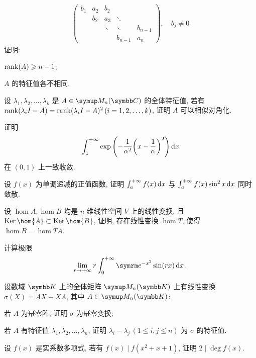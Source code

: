 \begin{exercise}[resume=exer]
\begin{align*}
\begin{pmatrix}
              b_{1} & a_{2} & b_{2} & & \\
              & b_{2} & a_{3} & \ddots & \\
              & & \ddots & \ddots & b_{n-1} \\
              & & & b_{n-1} & a_{n}
          \end{pmatrix},\quad b_{j} \ne 0
      \end{align*}
      证明:
      \begin{exercise}
          \item $ \rank(A) \geqslant n-1 $;
          \item $ A $ 的特征值各不相同.
      \end{exercise}
      \item 设 $ \lambda_{1}, \lambda_{2}, \dots, \lambda_{k} $ 是 $ A\in \MM[\C] $ 的全体特征值, 若有 $ \rank(\lambda_{i}I - A) = \rank(\lambda_{i}I - A)^{2}\,(i = 1, 2, \dots, k) $, 证明 $ A $ 可以相似对角化.
      \item 证明
      \begin{align*}
          \int_{1}^{+\infty}\exp\qty(-\frac{1}{\alpha^{2}}\qty(x-\frac{1}{\alpha})^{2}) \dx*
      \end{align*}
      在 $ (0, 1) $ 上一致收敛.
      \item 设 $ f(x) $ 为单调递减的正值函数, 证明 $ \int_{a}^{+\infty} f(x) \dx* $ 与 $ \int_{a}^{+\infty} f(x)\sin^{2}{x} \dx* $ 同时敛散.
      \item 设 $ \hom{A}, \hom{B} $ 均是 $ n $ 维线性空间 $ V $ 上的线性变换, 且 $ \Ker \hom{A} \subset \Ker \hom{B} $, 证明, 存在线性变换 $ \hom{T} $, 使得 $ \hom{B} = \hom{TA} $.
      \item 计算极限
      \begin{align*}
          \limit{r}{+\infty} r\int_{0}^{+\infty} \me^{-x^{2}}\sin(rx) \dx*.
      \end{align*}
      \item 设数域 $ \K $ 上的全体矩阵 $ \MM[\K] $ 上有线性变换 $ \sigma(X) = AX - XA $, 其中 $ A \in \MM[\K] $:
      \begin{exercise}
          \item 若 $ A $ 为幂零阵, 证明 $ \sigma $ 为幂零变换;
          \item 若 $ A $ 有特征值 $ \lambda_{1}, \lambda_{2}, \dots, \lambda_{n} $, 证明 $ \lambda_{i} - \lambda_{j}\,(1\le i, j\le n) $ 为 $ \sigma $ 的特征值.
      \end{exercise}
      \item 设 $ f(x) $ 是实系数多项式, 若有 $ f(x) \mid f(x^2 + x + 1) $, 证明 $ 2 \mid \deg f(x) $.

\end{exercise}
